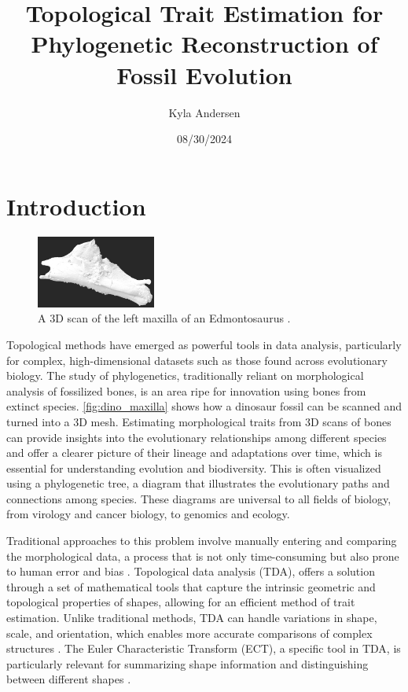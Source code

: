 \documentclass[12pt]{article}
\begin{document}
\title{Topological Trait Estimation for Phylogenetic Reconstruction of Fossil
Evolution}
\author{Kyla Andersen}
\date{08/30/2024}
\maketitle

\doublespacing

\section{Introduction}
\begin{figure}
	\centering
	\vspace{-12pt}
	\includegraphics[width=0.35\textwidth]{newDinoBone.png}
	\caption{A  3D scan of the left maxilla of an Edmontosaurus \citep{organ2024}.}
	\label{fig:dino_maxilla}
\end{figure}
\vspace{-15pt}

Topological methods have emerged as powerful tools in data analysis,
particularly for complex, high-dimensional datasets such as those found across
evolutionary biology. The study of phylogenetics, traditionally reliant on
morphological analysis of fossilized bones, is an area ripe for innovation
using bones from extinct species. \autoref{fig:dino_maxilla} shows how a 
dinosaur fossil can be scanned and turned into a 3D mesh. Estimating 
morphological traits from 3D scans of bones can provide insights into the 
evolutionary relationships among different species and offer a clearer picture 
of their lineage and adaptations over time, which is essential for understanding
evolution and biodiversity. This is often visualized using a phylogenetic tree, 
a diagram that illustrates the evolutionary paths and connections among species.
These diagrams are universal to all fields of biology, from virology and cancer
biology, to genomics and ecology.

Traditional approaches to this problem involve manually entering and comparing the 
morphological data, a process that is not only time-consuming but also prone to
human error and bias \citep{asher2022,bates2009}. Topological data analysis (TDA), 
offers a solution through a set  of mathematical tools that capture the intrinsic 
geometric and topological properties of shapes, allowing for an efficient method 
of trait estimation. Unlike traditional methods, TDA can handle variations in shape, 
scale, and orientation, which enables more accurate comparisons of complex 
structures \citep{zomorodian2009}. The Euler Characteristic Transform (ECT), 
a specific tool in TDA, is particularly relevant for summarizing shape information 
and distinguishing between different shapes \citep{cisewski2023}.
\end{document}
